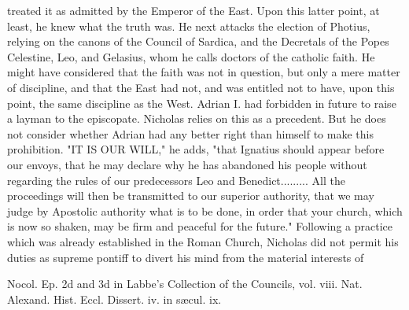treated it as admitted by the Emperor of the East. Upon this latter point, at least, he knew what the truth was. He next attacks the election of Photius, relying on the canons of the Council of Sardica, and the Decretals of the Popes Celestine, Leo, and Gelasius, whom he calls doctors of the catholic faith. He might have considered that the faith was not in question, but only a mere matter of discipline, and that the East had not, and was entitled not to have, upon this point, the same discipline as the West. Adrian I. had forbidden in future to raise a layman to the episcopate. Nicholas relies on this as a precedent. But he does not consider whether Adrian had any better right than himself to make this prohibition. "IT IS OUR WILL," he adds, "that Ignatius should appear before our envoys, that he may declare why he has abandoned his people without regarding the rules of our predecessors Leo and Benedict......... All the proceedings will then be transmitted to our superior authority, that we may judge by Apostolic authority what is to be done, in order that your church, which is now so shaken, may be firm and peaceful for the future." Following a practice which was already established in the Roman Church, Nicholas did not permit his duties as supreme pontiff to divert his mind from the material interests of

Nocol. Ep. 2d and 3d in Labbe’s Collection of the Councils, vol. viii. Nat. Alexand. Hist. Eccl. Dissert. iv. in sæcul. ix.

